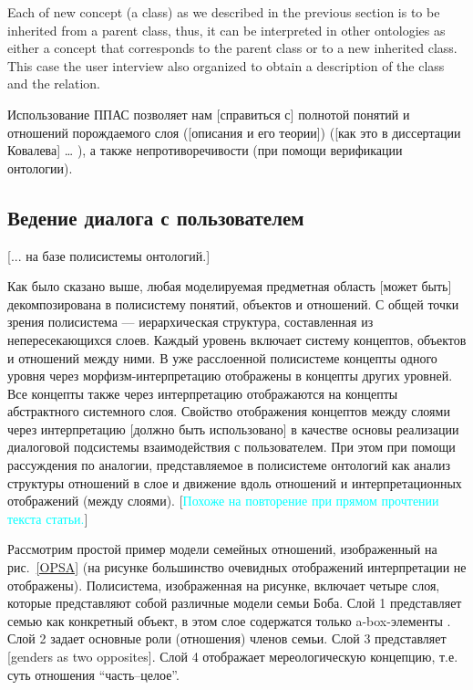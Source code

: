 \documentclass[utf8]{../IncArticle}
\newcommand{\e}[2][fcolor]{\textcolor{pcolor}{[}\textcolor{#1}{#2}\textcolor{pcolor}{]}}
\begin{document}
Each of new concept (a class) as we described in the previous section
is to be inherited from a parent class, thus, it can be interpreted in
other ontologies as either a concept that corresponds to the parent
class or to a new inherited class.  This case the user interview also
organized to obtain a description of the class and the relation.

Использование ППАС позволяет нам \e{справиться с} полнотой понятий и отношений
порождаемого слоя (\e{описания и его теории}) (\e{как это в диссертации Ковалева}
\ldots{} \cite{sergey}), а также непротиворечивости (при помощи
верификации онтологии).

\subsection{Ведение диалога с пользователем}

\e{... на базе полисистемы онтологий.}

Как было сказано выше, любая моделируемая предметная область \e{может
  быть} декомпозирована в полисистему понятий, объектов и отношений. С
общей точки зрения полисистема --- иерархическая структура,
составленная из непересекающихся слоев.  Каждый уровень включает
систему концептов, объектов и отношений между ними.  В уже
расслоенной полисистеме концепты одного уровня через
морфизм-интерпретацию отображены в концепты других уровней.  Все
концепты также через интерпретацию отображаются на концепты
абстрактного системного слоя.  Свойство отображения концептов между
слоями через интерпретацию \e{должно быть использовано} в качестве
основы реализации диалоговой подсистемы взаимодействия с
пользователем.  При этом при помощи рассуждения по аналогии,
представляемое в полисистеме онтологий как анализ структуры отношений
в слое и движение вдоль отношений и интерпретационных отображений
(между слоями).  \e[cyan]{Похоже на повторение при прямом прочтении
  текста статьи.}

Рассмотрим простой пример модели семейных отношений, изображенный на
рис.~\ref{OPSA} (на рисунке большинство очевидных отображений
интерпретации не отображены).  Полисистема, изображенная на рисунке,
включает четыре слоя, которые представляют собой различные модели
семьи Боба.  Слой 1 представляет семью как конкретный объект, в этом
слое содержатся только a-box-элементы \cite{abox}.  Слой 2 задает
основные роли (отношения) членов семьи. Слой 3 представляет \e{genders
  as two opposites}. Слой 4 отображает мереологическую концепцию,
т.е. суть отношения ``часть--целое''.
\end{document}

